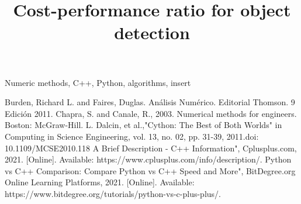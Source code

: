 \documentclass[conference]{IEEEtran}
\begin{document}
\title{Cost-performance ratio for object detection}

\author{
\and
{}
}

\maketitle



\begin{IEEEkeywords}
Numeric methods, C++, Python, algorithms, insert
\end{IEEEkeywords}






\begin{thebibliography}{00}
 Burden, Richard L. and Faires, Duglas. Análisis Numérico. Editorial Thomson. 9 Edición 2011.
 Chapra, S. and Canale, R., 2003. Numerical methods for engineers. Boston: McGraw-Hill.
L. Dalcin, et al.,"Cython: The Best of Both Worlds" in Computing in Science  Engineering, vol. 13, no. 02, pp. 31-39, 2011.doi: 10.1109/MCSE2010.118
 A Brief Description - C++ Information", Cplusplus.com, 2021. [Online]. Available: https://www.cplusplus.com/info/description/.
 Python vs C++ Comparison: Compare Python vs C++ Speed and More", BitDegree.org Online Learning Platforms, 2021. [Online]. Available: https://www.bitdegree.org/tutorials/python-vs-c-plus-plus/.
\end{thebibliography}
\end{document}
